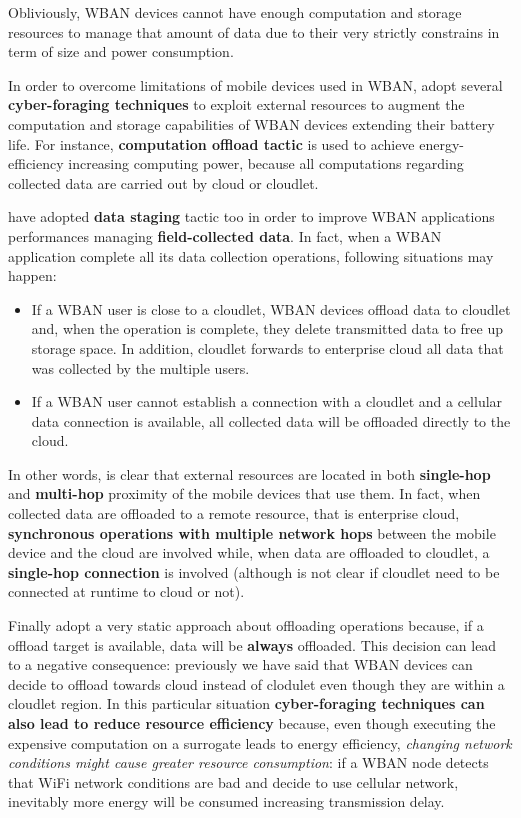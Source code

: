 \documentclass[sigchi]{acmart}
\begin{document}
\vspace{0.3cm}

Obliviously, WBAN devices cannot have enough computation and storage resources to manage that amount of data due to their very strictly constrains in term of size and power consumption. 

In order to overcome limitations of mobile devices used in WBAN, \citet{MSAReport} adopt several \textbf{cyber-foraging techniques} to exploit external resources to augment the computation and storage capabilities of WBAN devices extending their battery life. For instance, \textbf{computation offload tactic} is used to achieve energy-efficiency  increasing computing power, because all computations regarding collected data are carried out by cloud or cloudlet. 

\citet{MSAReport} have adopted \textbf{data staging} tactic too in order to improve WBAN applications performances managing \textbf{field-collected data}. In fact, when a WBAN application complete all its data collection operations, following situations may happen:

\begin{itemize}
\item If a WBAN user is close to a cloudlet, WBAN devices offload data to cloudlet and, when the operation is complete, they delete transmitted data to free up storage space. In addition, cloudlet forwards to enterprise cloud all data that was collected by the multiple users.

\item If a WBAN user cannot establish a connection with a cloudlet and a cellular data connection is available, all collected data will be offloaded directly to the cloud.
\end{itemize}

In other words, is clear that external resources are located in both \textbf{single-hop} and \textbf{multi-hop} proximity of the mobile devices that use them. In fact, when collected data are offloaded to a remote resource, that is enterprise cloud, \textbf{synchronous operations with multiple network hops} between the mobile device and the cloud are involved while, when data are offloaded to cloudlet, a \textbf{single-hop connection} is involved (although is not clear if cloudlet need to be connected at runtime to cloud or not).

Finally \citet{MSAReport} adopt a very static approach about offloading operations because, if a offload target is available, data will be \textbf{always} offloaded. This decision can lead to a negative consequence: previously we have said that WBAN devices can decide to offload towards cloud instead of clodulet even though they are within a cloudlet region. In this particular situation \textbf{cyber-foraging techniques can also lead to reduce resource efficiency} because, even though executing the expensive computation on a surrogate leads to energy efficiency, \textit{changing network conditions might cause greater resource consumption}: if a WBAN node detects that WiFi network conditions are bad and decide to use cellular network, inevitably more energy will be consumed increasing transmission delay.
\end{document}
